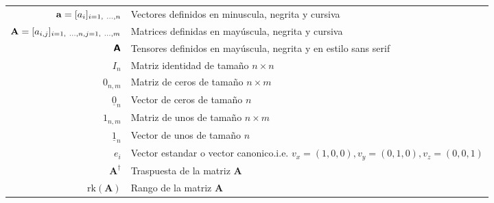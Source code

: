 \begin{table}[ht!]
\begin{center}
\begin{tabularx}{\textwidth}{|r|X|}
            \hline %
            $ \mathVector{a} = [a_{i}]_{i=1, ~\ldots, n} $                    & Vectores definidos en minuscula, negrita y cursiva                                                                         \\
            $ \mathMatrix{A} = [a_{i,j}]_{i=1, ~\ldots, n, j=1, ~\ldots, m} $ & Matrices definidas en mayúscula, negrita y cursiva                                                                         \\
            $ \mathTensor{A} $                                                & Tensores definidos en mayúscula, negrita y en estilo sans serif                                                            \\
            \hline
            $ I_{n} $                                                         & Matriz identidad de tamaño $ n \times n $                                                                                  \\
            $ 0_{n,m} $                                                       & Matriz de ceros de tamaño $ n \times m $                                                                                   \\
            $ \underline{0}_{n} $                                             & Vector de ceros de tamaño $ n $                                                                                            \\
            $ 1_{n,m} $                                                       & Matriz de unos de tamaño $ n \times m $                                                                                    \\
            $ \underline{1}_{n} $                                             & Vector de unos de tamaño $n $                                                                                              \\
            $ e_{i} $                                                         & Vector estandar o vector canonico.\newline i.e. \scriptsize{${ v_{x} = (1,0,0), v_{y} = (0,1,0), v_{z} = (0,0,1)} $}       \\
            \hline
            $ \mathbf{A}^{\dagger} $                                          & Traspuesta de la matriz $\mathbf{A}$                                                                                       \\
            $ \text{rk}\left(\mathbf{A}\right) $                              & Rango de la matriz $\mathbf{A}$                                                                                            \\

\end{tabularx}
\end{center}
\end{table}

